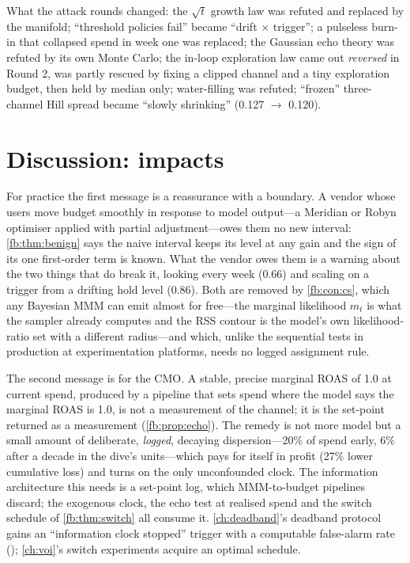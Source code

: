 What the attack rounds changed: the $\sqrt t$ growth law was refuted and replaced by the manifold; ``threshold policies fail'' became ``drift $\times$ trigger''; a pulseless burn-in that collapsed spend in week one was replaced; the Gaussian echo theory was refuted by its own Monte Carlo; the in-loop exploration law came out \emph{reversed} in Round 2, was partly rescued by fixing a clipped channel and a tiny exploration budget, then held by median only; water-filling was refuted; ``frozen'' three-channel Hill spread became ``slowly shrinking'' (0.127 $\to$ 0.120).

\section{Discussion: impacts}

For practice the first message is a reassurance with a boundary. A vendor whose users move budget smoothly in response to model output---a Meridian or Robyn optimiser applied with partial adjustment---owes them no new interval: \cref{fb:thm:benign} says the naive interval keeps its level at any gain and the sign of its one first-order term is known. What the vendor owes them is a warning about the two things that do break it, looking every week (0.66) and scaling on a trigger from a drifting hold level (0.86). Both are removed by \cref{fb:con:cs}, which any Bayesian MMM can emit almost for free---the marginal likelihood $m_t$ is what the sampler already computes and the RSS contour is the model's own likelihood-ratio set with a different radius---and which, unlike the sequential tests in production at experimentation platforms, needs no logged assignment rule.

The second message is for the CMO. A stable, precise marginal ROAS of 1.0 at current spend, produced by a pipeline that sets spend where the model says the marginal ROAS is 1.0, is not a measurement of the channel; it is the set-point returned as a measurement (\cref{fb:prop:echo}). The remedy is not more model but a small amount of deliberate, \emph{logged}, decaying dispersion---20\% of spend early, 6\% after a decade in the dive's units---which pays for itself in profit (27\% lower cumulative loss) and turns on the only unconfounded clock. The information architecture this needs is a set-point log, which MMM-to-budget pipelines discard; the exogenous clock, the echo test at realised spend and the switch schedule of \cref{fb:thm:switch} all consume it. \cref{ch:deadband}'s deadband protocol gains an ``information clock stopped'' trigger with a computable false-alarm rate (); \cref{ch:voi}'s switch experiments acquire an optimal schedule.

